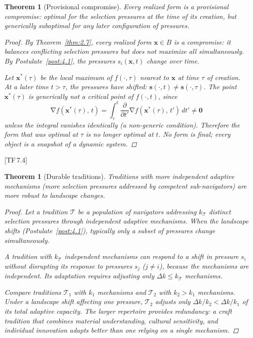 \documentclass[10pt]{article}
\theoremstyle{definition}
\theoremstyle{plain}
\newtheorem{theorem}[definition]{Theorem}
\theoremstyle{remark}
\DeclareMathOperator{\grad}{\nabla}
\newcommand{\TF}[1]{\textnormal{[TF\,#1]}}  %
\begin{document}
\begin{theorem}[Provisional compromise]\label{thm:9.1}
Every realized form is a \emph{provisional} compromise: optimal for the
selection pressures at the time of its creation, but generically
suboptimal for any later configuration of pressures.

\begin{proof}
By Theorem~\ref{thm:2.7}, every realized form $\bm{x} \in B$ is a
compromise: it balances conflicting selection pressures but does not
maximize all simultaneously. By Postulate~\ref{post:4.1}, the pressures
$s_i(\bm{x}, t)$ change over time.

Let $\bm{x}^*(\tau)$ be the local maximum of
$f(\cdot, \tau)$ nearest to $\bm{x}$ at time $\tau$ of creation. At a
later time $t > \tau$, the pressures have shifted:
$\bm{s}(\cdot, t) \neq \bm{s}(\cdot, \tau)$. The point
$\bm{x}^*(\tau)$ is generically \emph{not} a critical point of
$f(\cdot, t)$, since
\[
  \grad f(\bm{x}^*(\tau),\, t) =
  \int_\tau^t \frac{\partial}{\partial t'}
  \grad f(\bm{x}^*(\tau),\, t')\, dt'
  \neq \bm{0}
\]
unless the integral vanishes identically (a non-generic condition).
Therefore the form that was optimal at $\tau$ is no longer optimal at $t$.
No form is final; every object is a snapshot of a dynamic system.
\qedhere
\end{proof}
\end{theorem}

\TF{7.4}

\begin{theorem}[Durable traditions]\label{thm:9.2}
Traditions with more independent adaptive mechanisms (more selection
pressures addressed by competent sub-navigators) are more robust to
landscape changes.

\begin{proof}
Let a tradition $\mathcal{T}$ be a population of navigators addressing
$k_\mathcal{T}$ distinct selection pressures through independent adaptive
mechanisms. When the landscape shifts (Postulate~\ref{post:4.1}),
typically only a subset of pressures change simultaneously.

A tradition with $k_\mathcal{T}$ independent mechanisms can respond to
a shift in pressure $s_i$ without disrupting its response to pressures
$s_j$ ($j \neq i$), because the mechanisms are independent. Its
adaptation requires adjusting only
$\Delta k \leq k_\mathcal{T}$ mechanisms.

Compare traditions $\mathcal{T}_1$ with $k_1$ mechanisms and
$\mathcal{T}_2$ with $k_2 > k_1$ mechanisms. Under a landscape shift
affecting one pressure, $\mathcal{T}_2$ adjusts only
$\Delta k / k_2 < \Delta k / k_1$ of its total adaptive capacity.
The larger repertoire provides redundancy: a craft tradition that
combines material understanding, cultural sensitivity, and individual
innovation adapts better than one relying on a single mechanism.
\qedhere
\end{proof}
\end{theorem}
\end{document}
